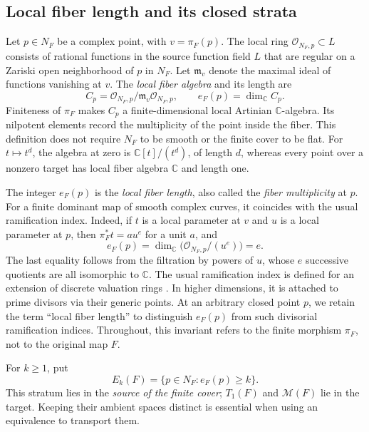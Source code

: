 \documentclass[11pt]{article}
\numberwithin{equation}{section}
\theoremstyle{plain}
\theoremstyle{definition}
\theoremstyle{remark}
\newcommand{\C}{\mathbb{C}}
\newcommand{\Miss}{\mathcal M}
\begin{document}
\subsection{Local fiber length and its closed strata}
Let $p\in N_F$ be a complex point, with $v=\pi_F(p)$. The local ring
$\mathcal O_{N_F,p}\subset L$ consists of rational functions in the source
function field $L$ that are regular on a Zariski open neighborhood of $p$
in $N_F$.
Let $\mathfrak m_v$ denote the maximal ideal of functions vanishing at $v$.
The \emph{local fiber algebra} and its length are
\begin{equation}\label{prod:eq:fiber-length}
 C_p=\mathcal O_{N_F,p}/\mathfrak m_v\mathcal O_{N_F,p},\qquad
 e_F(p)=\dim_\C C_p.
\end{equation}
Finiteness of $\pi_F$ makes $C_p$ a finite-dimensional local Artinian
$\C$-algebra. Its nilpotent elements record the multiplicity of the point
inside the fiber. This definition does not require $N_F$ to be smooth or
the finite cover to be flat. For $t\mapsto t^d$, the algebra at zero is
$\C[t]/(t^d)$, of length $d$, whereas every point over a nonzero target
has local fiber algebra $\C$ and length one.

The integer $e_F(p)$ is the \emph{local fiber length}, also called the
\emph{fiber multiplicity} at $p$. For a finite dominant map of smooth
complex curves, it coincides with the usual ramification index. Indeed,
if $t$ is a local parameter at $v$ and $u$ is a local parameter at $p$,
then $\pi_F^*t=a u^e$ for a unit $a$, and
\[
 e_F(p)=\dim_\C\bigl(\mathcal O_{N_F,p}/(u^e)\bigr)=e.
\]
The last equality follows from the filtration by powers of $u$, whose
$e$ successive quotients are all isomorphic to $\C$.
The usual ramification index is defined for an extension of discrete
valuation rings \cite{StacksRamification}. In higher dimensions, it is
attached to prime divisors via their generic points. At an arbitrary
closed point $p$, we retain the term ``local fiber length'' to distinguish
$e_F(p)$ from such divisorial ramification indices. Throughout, this
invariant refers to the finite morphism $\pi_F$, not to the original map $F$.

For $k\geq1$, put
\[
 E_k(F)=\{p\in N_F:e_F(p)\geq k\}.
\]
This stratum lies in the \emph{source of the finite cover}; $T_1(F)$ and
$\Miss(F)$ lie in the target. Keeping their ambient spaces distinct is
essential when using an equivalence to transport them.
\end{document}
